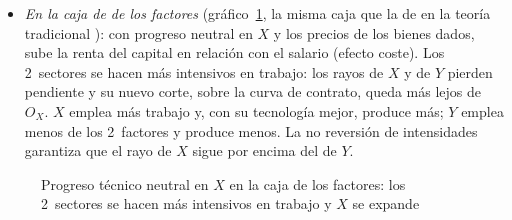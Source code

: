\documentclass[11pt]{article}
\begin{document}
\begin{itemize}
\item \emph{En la caja de  de los factores} (gráfico~\ref{fig:progreso-caja}, la misma caja que la de  en la teoría tradicional ): con progreso neutral en $X$ y los precios de los bienes dados, sube la renta del capital en relación con el salario (efecto coste). Los 2~sectores se hacen más intensivos en trabajo: los rayos de $X$ y de $Y$ pierden pendiente y su nuevo corte, sobre la curva de contrato, queda más lejos de $O_X$. $X$ emplea más trabajo y, con su tecnología mejor, produce más; $Y$ emplea menos de los 2~factores y produce menos. La no reversión de intensidades garantiza que el rayo de $X$ sigue por encima del de $Y$.
\end{itemize}
\begin{figure}[H]
\centering
\caption{Progreso técnico neutral en $X$ en la caja de los factores: los 2~sectores se hacen más intensivos en trabajo y $X$ se expande}\label{fig:progreso-caja}
\end{figure}
\end{document}
